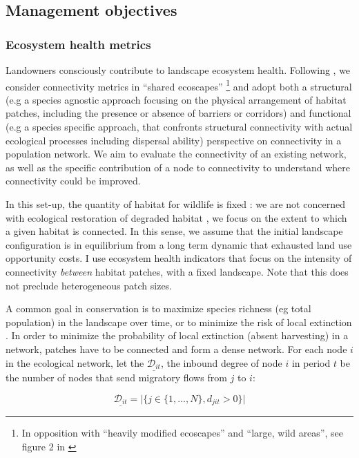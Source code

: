 \documentclass{article}
\begin{document}
\subsection{Management objectives}

\subsubsection{Ecosystem health metrics}
Landowners consciously contribute to landscape ecosystem health. Following \cite{keeley_connectivity_2021}, we consider connectivity metrics in \enquote{shared ecoscapes}
\footnote{In opposition with \enquote{heavily modified ecoscapes} and \enquote{large, wild areas}, see figure 2 in \cite{keeley_connectivity_2021}} and adopt both a structural (e.g a species agnostic approach focusing on the physical arrangement of habitat patches, including the presence or absence of barriers or corridors) and functional (e.g a species specific approach, that confronts structural connectivity with actual ecological processes including dispersal ability) perspective on connectivity in a population network. We aim to evaluate the connectivity of an existing network, as well as the specific contribution of a node to connectivity to understand where connectivity could be improved.

In this set-up, the quantity of habitat for wildlife is fixed : we are not concerned with ecological restoration of degraded habitat \citep{rohr_ecology_2018}, we focus on the extent to which a given habitat is connected. In this sense, we assume that the initial landscape configuration is in equilibrium from a long term dynamic that exhausted land use opportunity costs. I use ecosystem health indicators that focus on the intensity of connectivity \textit{between} habitat patches, with a fixed landscape. Note that this does not preclude heterogeneous patch sizes.

A common goal in conservation is to maximize species richness (eg total population) in the landscape over time, or to minimize the risk of local extinction \citep{nicholson_new_2006}. In order to minimize the probability of local extinction (absent harvesting) in a network, patches have to be connected and form a dense network. For each node $i$ in the ecological network, let the $\underline{\mathcal{D}_{it}}$, the inbound degree of node $i$ in period $t$ be the number of nodes that send migratory flows from $j$ to $i$:

\begin{equation}
\underline{\mathcal{D}_{it}} = \big|\{j \in \{1, ..., N \}, d_{jit}>0\} \big|
\end{equation}
\end{document}
